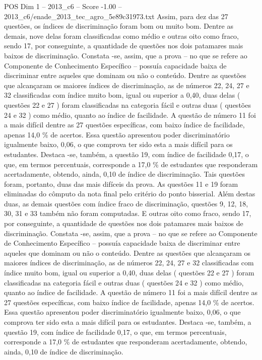 \begin{textsample}{POS Dim 1 – 2013\_c6 – Score -1.00 – 2013\_c6/enade\_2013\_tec\_agro\_5e89c31973.txt}
Assim, para dez das 27 questões, os índices de discriminação foram bom ou muito bom.
Dentre as demais, nove delas foram classificadas como médio e outras oito como fraco, sendo 17, por conseguinte, a quantidade de questões nos dois patamares mais baixos de discriminação.
Constata -se, assim, que a prova – no que se refere ao Componente de Conhecimento Específico – possuía capacidade baixa de discriminar entre aqueles que dominam ou não o conteúdo.
Dentre as questões que alcançaram os maiores índices de discriminação, as de números 22, 24, 27 e 32 classificadas com índice muito bom, igual ou superior a 0,40, duas delas ( questões 22 e 27 ) foram classificadas na categoria fácil e outras duas ( questões 24 e 32 ) como médio, quanto ao índice de facilidade.
A questão de número 11 foi a mais difícil dentre as 27 questões específicas, com baixo índice de facilidade, apenas 14,0 \% de acertos.
Essa questão apresentou poder discriminatório igualmente baixo, 0,06, o que comprova ter sido esta a mais difícil para os estudantes.
Destaca -se, também, a questão 19, com índice de facilidade 0,17, o que, em termos percentuais, corresponde a 17,0 \% de estudantes que responderam acertadamente, obtendo, ainda, 0,10 de índice de discriminação.
Tais questões foram, portanto, duas das mais difíceis da prova.
As questões 11 e 19 foram eliminadas do cômputo da nota final pelo critério do ponto bisserial.
Além destas duas, as demais questões com índice fraco de discriminação, questões 9, 12, 18, 30, 31 e 33 também não foram computadas.
E outras oito como fraco, sendo 17, por conseguinte, a quantidade de questões nos dois patamares mais baixos de discriminação.
Constata -se, assim, que a prova – no que se refere ao Componente de Conhecimento Específico – possuía capacidade baixa de discriminar entre aqueles que dominam ou não o conteúdo.
Dentre as questões que alcançaram os maiores índices de discriminação, as de números 22, 24, 27 e 32 classificadas com índice muito bom, igual ou superior a 0,40, duas delas ( questões 22 e 27 ) foram classificadas na categoria fácil e outras duas ( questões 24 e 32 ) como médio, quanto ao índice de facilidade.
A questão de número 11 foi a mais difícil dentre as 27 questões específicas, com baixo índice de facilidade, apenas 14,0 \% de acertos.
Essa questão apresentou poder discriminatório igualmente baixo, 0,06, o que comprova ter sido esta a mais difícil para os estudantes.
Destaca -se, também, a questão 19, com índice de facilidade 0,17, o que, em termos percentuais, corresponde a 17,0 \% de estudantes que responderam acertadamente, obtendo, ainda, 0,10 de índice de discriminação.

\end{textsample}
